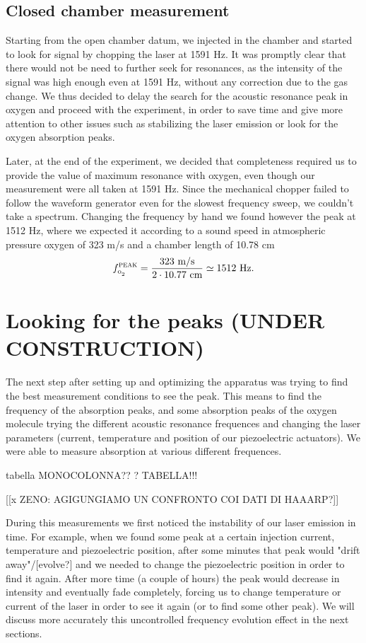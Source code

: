 		\subsection{Closed chamber measurement}
Starting from the open chamber datum, we injected  in the chamber and started to look for signal by chopping the laser at 1591 Hz. It was promptly clear that there would not be need to further seek for resonances, as the intensity of the signal was high enough even at 1591 Hz, without any correction due to the gas change. We thus decided to delay the search for the acoustic resonance peak in oxygen and proceed with the experiment, in order to save time and give more attention to other issues such as stabilizing the laser emission or look for the oxygen absorption peaks.

Later, at the end of the experiment, we decided that completeness required us to provide the value of maximum resonance with oxygen, even though our measurement were all taken at 1591 Hz. Since the mechanical chopper failed to follow the waveform generator even for the slowest frequency sweep, we couldn't take a spectrum. Changing the frequency by hand we found however the peak at 1512 Hz, where we expected it according to a sound speed in atmospheric pressure oxygen of 323 m/s and a chamber length of 10.78 cm$$f^{\mai{peak}}_{\ce{o2}}=\frac{323\mbox{ m/s}}{2\cdot10.77\mbox{ cm}}\simeq1512\mbox{ Hz.}$$

\section{Looking for the \texorpdfstring{}{} peaks (UNDER CONSTRUCTION)}
The next step after setting up and optimizing the apparatus was trying to find the best measurement conditions to see the peak. This means to find the frequency of the  absorption peaks, and some absorption peaks of the oxygen molecule trying the different acoustic resonance frequences and changing the laser parameters (current, temperature and position of our piezoelectric actuators). 
We were able to measure absorption at various different frequences. 

tabella MONOCOLONNA?? ? TABELLA!!! 

[[x ZENO: AGIGUNGIAMO UN CONFRONTO COI DATI DI HAAARP?]]

During this measurements we first noticed the instability of our laser emission in time. For example, when we found some peak at a certain injection current, 
temperature and piezoelectric position, after some minutes that peak would  "drift away"/[evolve?] and we needed to change the piezoelectric position in order to find it again.
After more time (a couple of hours) the peak would decrease in intensity and eventually fade completely, forcing us to change temperature or current of the laser
in order to see it again (or to find some other peak). We will discuss more accurately this uncontrolled frequency evolution effect in the next sections. 

